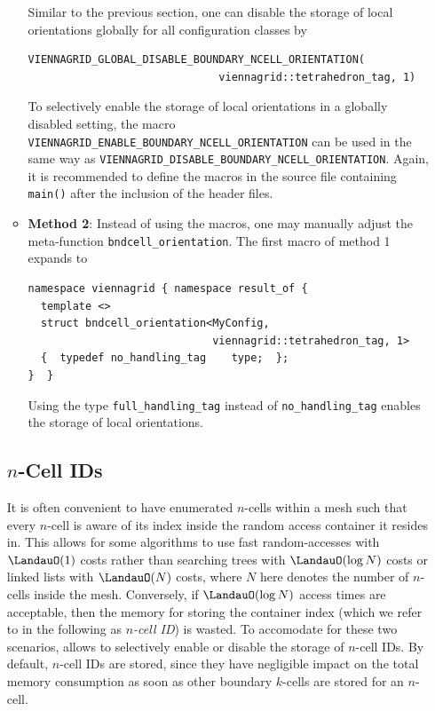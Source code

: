 \begin{itemize}
\begin{itemize}
Similar to the previous section, one can disable the storage of local orientations globally for all configuration classes by
\begin{lstlisting}
VIENNAGRID_GLOBAL_DISABLE_BOUNDARY_NCELL_ORIENTATION(
                              viennagrid::tetrahedron_tag, 1)
\end{lstlisting}
To selectively enable the storage of local orientations in a globally disabled setting, the macro \lstinline|VIENNAGRID_ENABLE_BOUNDARY_NCELL_ORIENTATION| can be used in the same way as \lstinline|VIENNAGRID_DISABLE_BOUNDARY_NCELL_ORIENTATION|.
Again, it is recommended to define the macros in the source file containing \lstinline|main()| after the inclusion of the {\ViennaGrid} header files.

 \item \textbf{Method 2}: Instead of using the macros, one may manually adjust the meta-function \lstinline|bndcell_orientation|. The first macro of method 1 expands to
 \begin{lstlisting}
namespace viennagrid { namespace result_of {
  template <>
  struct bndcell_orientation<MyConfig,
                             viennagrid::tetrahedron_tag, 1>
  {  typedef no_handling_tag    type;  };
}  }
 \end{lstlisting}
Using the type \lstinline|full_handling_tag| instead of \lstinline|no_handling_tag| enables the storage of local orientations.
\end{itemize}


\subsection{$n$-Cell IDs} \label{subsec:ncell-ids}
It is often convenient to have enumerated $n$-cells within a mesh such that every $n$-cell is aware of its index inside the random access container it resides in. This allows for some algorithms to use fast random-accesses with $\LandauO(1)$ costs rather than searching trees with $\LandauO(\log N)$ costs or linked lists with $\LandauO(N)$ costs, where $N$ here denotes the number of $n$-cells inside the mesh. Conversely, if $\LandauO(\log N)$ access times are acceptable, then the memory for storing the container index (which we refer to in the following as \emph{$n$-cell ID}) is wasted. To accomodate for these two scenarios, {\ViennaGrid} allows to selectively enable or disable the storage of $n$-cell IDs. By default, $n$-cell IDs are stored, since they have negligible impact on the total memory consumption as soon as other boundary $k$-cells are stored for an $n$-cell.


\end{itemize}
